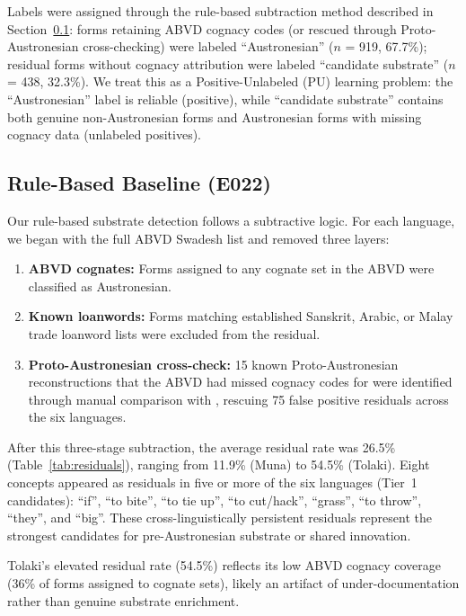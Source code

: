\documentclass[12pt]{article}
\begin{document}
Labels were assigned through the rule-based subtraction method described in Section~\ref{sec:rule_based}: forms retaining ABVD cognacy codes (or rescued through Proto-Austronesian cross-checking) were labeled ``Austronesian'' ($n$ = 919, 67.7\%); residual forms without cognacy attribution were labeled ``candidate substrate'' ($n$ = 438, 32.3\%).
We treat this as a Positive-Unlabeled (PU) learning problem: the ``Austronesian'' label is reliable (positive), while ``candidate substrate'' contains both genuine non-Austronesian forms and Austronesian forms with missing cognacy data (unlabeled positives).

\subsection{Rule-Based Baseline (E022)}
\label{sec:rule_based}

Our rule-based substrate detection follows a subtractive logic.
For each language, we began with the full ABVD Swadesh list and removed three layers:

\begin{enumerate}
    \item \textbf{ABVD cognates:} Forms assigned to any cognate set in the ABVD were classified as Austronesian.
    \item \textbf{Known loanwords:} Forms matching established Sanskrit, Arabic, or Malay trade loanword lists were excluded from the residual.
    \item \textbf{Proto-Austronesian cross-check:} 15 known Proto-Austronesian reconstructions that the ABVD had missed cognacy codes for were identified through manual comparison with \citet{blust2013}, rescuing 75 false positive residuals across the six languages.
\end{enumerate}

After this three-stage subtraction, the average residual rate was 26.5\% (Table~\ref{tab:residuals}), ranging from 11.9\% (Muna) to 54.5\% (Tolaki).
Eight concepts appeared as residuals in five or more of the six languages (Tier~1 candidates): ``if'', ``to bite'', ``to tie up'', ``to cut/hack'', ``grass'', ``to throw'', ``they'', and ``big''.
These cross-linguistically persistent residuals represent the strongest candidates for pre-Austronesian substrate or shared innovation.

Tolaki's elevated residual rate (54.5\%) reflects its low ABVD cognacy coverage (36\% of forms assigned to cognate sets), likely an artifact of under-documentation rather than genuine substrate enrichment.
\end{document}
